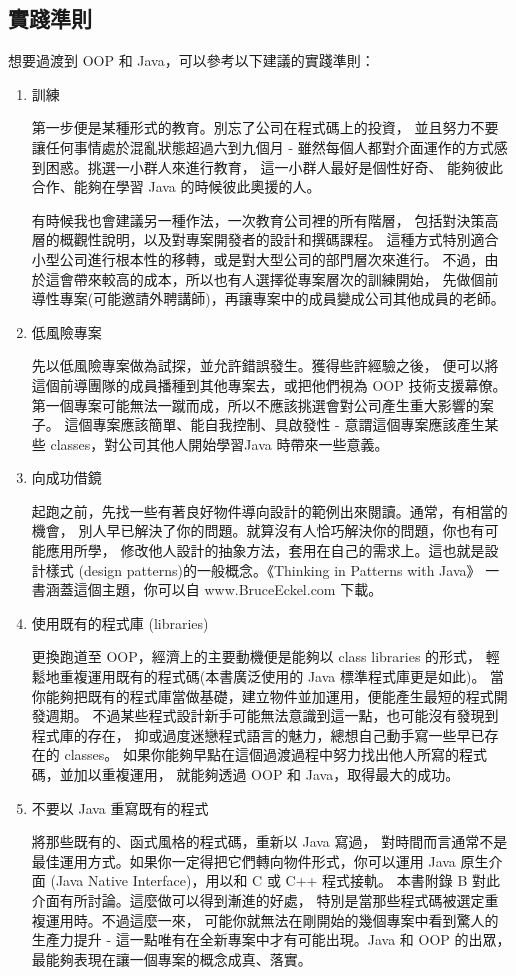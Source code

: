 \subsection{實踐準則}
想要過渡到 OOP 和 Java，可以參考以下建議的實踐準則：
\begin{enumerate}
\item 訓練
\

第一步便是某種形式的教育。別忘了公司在程式碼上的投資，
並且努力不要讓任何事情處於混亂狀態超過六到九個月 -
雖然每個人都對介面運作的方式感到困惑。挑選一小群人來進行教育，
這一小群人最好是個性好奇、 能夠彼此合作、能夠在學習
Java 的時候彼此奧援的人。

有時候我也會建議另一種作法，一次教育公司裡的所有階層，
包括對決策高層的概觀性說明，以及對專案開發者的設計和撰碼課程。
這種方式特別適合小型公司進行根本性的移轉，或是對大型公司的部門層次來進行。
不過，由於這會帶來較高的成本，所以也有人選擇從專案層次的訓練開始，
先做個前導性專案(可能邀請外聘講師)，再讓專案中的成員變成公司其他成員的老師。

\item 低風險專案
\

先以低風險專案做為試探，並允許錯誤發生。獲得些許經驗之後，
便可以將這個前導團隊的成員播種到其他專案去，或把他們視為 OOP 技術支援幕僚。
第一個專案可能無法一蹴而成，所以不應該挑選會對公司產生重大影響的案子。
這個專案應該簡單、能自我控制、具啟發性 - 意謂這個專案應該產生某些
classes，對公司其他人開始學習Java 時帶來一些意義。
\item 向成功借鏡
\

起跑之前，先找一些有著良好物件導向設計的範例出來閱讀。通常，有相當的機會，
別人早已解決了你的問題。就算沒有人恰巧解決你的問題，你也有可能應用所學，
修改他人設計的抽象方法，套用在自己的需求上。這也就是設計樣式
(design patterns)的一般概念。《Thinking in Patterns with Java》
一書涵蓋這個主題，你可以自 www.BruceEckel.com 下載。
\item 使用既有的程式庫 (libraries)
\

更換跑道至 OOP，經濟上的主要動機便是能夠以 class libraries 的形式，
輕鬆地重複運用既有的程式碼(本書廣泛使用的 Java 標準程式庫更是如此)。
當你能夠把既有的程式庫當做基礎，建立物件並加運用，便能產生最短的程式開發週期。
不過某些程式設計新手可能無法意識到這一點，也可能沒有發現到程式庫的存在，
抑或過度迷戀程式語言的魅力，總想自己動手寫一些早已存在的 classes。
如果你能夠早點在這個過渡過程中努力找出他人所寫的程式碼，並加以重複運用，
就能夠透過 OOP 和 Java，取得最大的成功。
\item 不要以 Java 重寫既有的程式
\

將那些既有的、函式風格的程式碼，重新以 Java 寫過，
對時間而言通常不是最佳運用方式。如果你一定得把它們轉向物件形式，你可以運用
Java 原生介面 (Java Native Interface)，用以和 C 或 C++ 程式接軌。
本書附錄 B 對此介面有所討論。這麼做可以得到漸進的好處，
特別是當那些程式碼被選定重複運用時。不過這麼一來，
可能你就無法在剛開始的幾個專案中看到驚人的生產力提升 -
這一點唯有在全新專案中才有可能出現。Java 和 OOP 的出眾，
最能夠表現在讓一個專案的概念成真、落實。
\end{enumerate}

